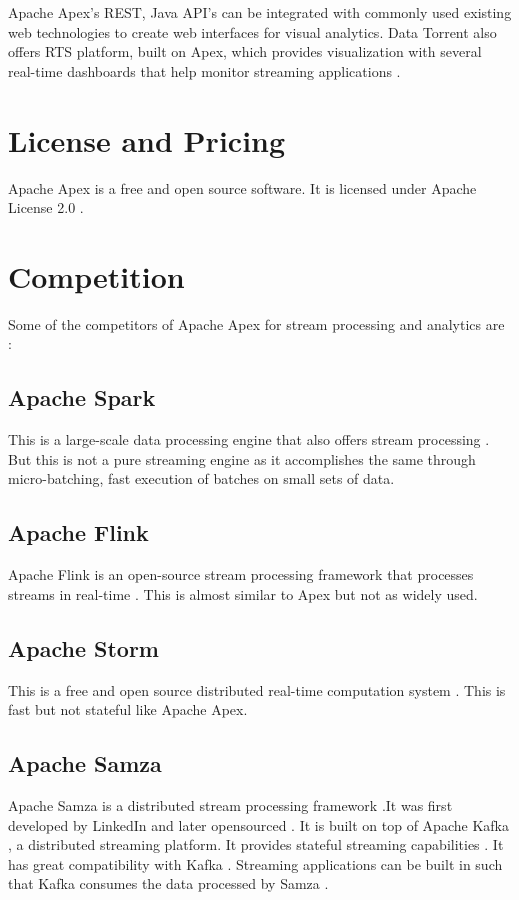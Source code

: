 \documentclass[9pt,twocolumn,twoside]{../../styles/osajnl}
\begin{document}
Apache Apex's REST, Java API's can be integrated with commonly used existing web technologies to create web interfaces for visual analytics. Data Torrent also offers RTS platform, built on Apex, which provides visualization with several real-time dashboards that help monitor streaming applications \cite{www-apacheapexintroslideshare}.

\section{License and Pricing}
Apache Apex is a free and open source software. It is licensed under Apache License 2.0 \cite{www-apacheapexsite}.  


\section{Competition}
Some of the competitors of Apache Apex for stream processing and analytics are \cite{www-apacheapexcompetition}:
\subsection{Apache Spark}
 This is a large-scale data processing engine that also offers stream processing \cite{www-apachesparksite}. But this is not a pure streaming engine as it accomplishes the same through micro-batching, fast execution of batches on small sets of data. 
\subsection{Apache Flink}
Apache Flink is an open-source stream processing framework that processes streams in real-time \cite{www-apacheapexflink}. This is almost similar to Apex but not as widely used.
\subsection{Apache Storm}
This is a free and open source distributed real-time computation system \cite{www-apachestormsite}. This is fast but not stateful like Apache Apex.
\subsection{Apache Samza}
Apache Samza is a distributed stream processing framework \cite{www-apachesamzasite}.It was first developed by LinkedIn and later opensourced \cite{www-newsstacksamza}. It is built on top of Apache Kafka \cite{www-apachekafkasite}, a distributed streaming platform. It provides stateful streaming capabilities \cite{www-newsstacksamza}. It has great compatibility with Kafka \cite{www-newsstacksamza}. Streaming applications can be built in such that Kafka consumes the data processed by Samza \cite{www-newsstacksamza}.
\end{document}
